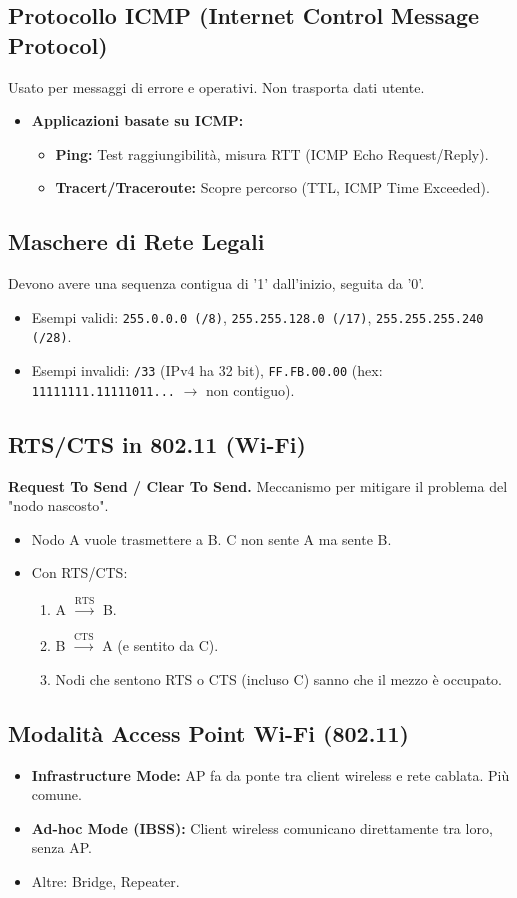 \documentclass{article}
\begin{document}
\subsection{Protocollo ICMP (Internet Control Message Protocol)}
Usato per messaggi di errore e operativi. Non trasporta dati utente.
\begin{itemize}
    \item \textbf{Applicazioni basate su ICMP:}
    \begin{itemize}
        \item \textbf{Ping:} Test raggiungibilità, misura RTT (ICMP Echo Request/Reply).
        \item \textbf{Tracert/Traceroute:} Scopre percorso (TTL, ICMP Time Exceeded).
    \end{itemize}
\end{itemize}

\subsection{Maschere di Rete Legali}
Devono avere una sequenza contigua di '1' dall'inizio, seguita da '0'.
\begin{itemize}
    \item Esempi validi: \texttt{255.0.0.0 (/8)}, \texttt{255.255.128.0 (/17)}, \texttt{255.255.255.240 (/28)}.
    \item Esempi invalidi: \texttt{/33} (IPv4 ha 32 bit), \texttt{FF.FB.00.00} (hex: \texttt{11111111.11111011...} $\rightarrow$ non contiguo).
\end{itemize}

\subsection{RTS/CTS in 802.11 (Wi-Fi)}
\textbf{Request To Send / Clear To Send.} Meccanismo per mitigare il problema del "nodo nascosto".
\begin{itemize}
    \item Nodo A vuole trasmettere a B. C non sente A ma sente B.
    \item Con RTS/CTS:
    \begin{enumerate}
        \item A $\xrightarrow{\text{RTS}}$ B.
        \item B $\xrightarrow{\text{CTS}}$ A (e sentito da C).
        \item Nodi che sentono RTS o CTS (incluso C) sanno che il mezzo è occupato.
    \end{enumerate}
\end{itemize}

\subsection{Modalità Access Point Wi-Fi (802.11)}
\begin{itemize}
    \item \textbf{Infrastructure Mode:} AP fa da ponte tra client wireless e rete cablata. Più comune.
    \item \textbf{Ad-hoc Mode (IBSS):} Client wireless comunicano direttamente tra loro, senza AP.
    \item Altre: Bridge, Repeater.
\end{itemize}
\end{document}
